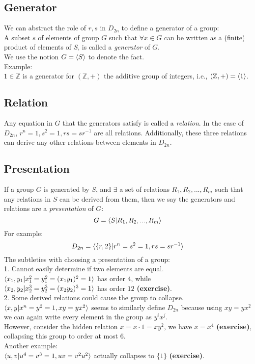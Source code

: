 \documentclass{article}
\begin{document}
\subsection{Generator}
We can abstract the role of $r, s$ in $D_{2n}$ to define a generator of a group:\\
A subset $s$ of elements of group $G$ such that $\forall x \in G$ can be written as a (finite) product of elements of $S$, is called a \textit{generator} of $G$.\\
We use the notion $G = \braket{S}$ to denote the fact.\\
Example:\\
$1 \in \mathbb{Z}$ is a generator for $(\mathbb{Z},+)$ the additive group of integers, i.e., $(\mathbb{Z}, +)=\braket{1}$.
\subsection{Relation}
Any equation in $G$ that the generators satisfy is called a \textit{relation}. In the case of $D_{2n}$, $r^n=1, s^2=1, rs=sr^{-1}$ are all relations. Additionally, these three relations can derive any other relations between elements in $D_{2n}$.
\subsection{Presentation}
If a group $G$ is generated by $S$, and $\exists$ a set of relations ${R_1, R_2, ..., R_m}$ such that any relations in $S$ can be derived from them, then we say the generators and relations are a \textit{presentation} of $G$:
\begin{equation*}
    G=\braket{S|R_1, R_2, ..., R_m}
\end{equation*}
For example:
\begin{equation*}
    D_{2n}=\braket{\{r,2\}|r^n=s^2=1, rs=sr^{-1}}
\end{equation*}
The subtleties with choosing a presentation of a group:\\
1. Cannot easily determine if two elements are equal.\\
$\braket{x_1, y_1 | x_1^2=y_1^2=(x_1y_1)^2=1}$ has order $4$, while\\
$\braket{x_2, y_2 | x_2^3=y_2^3=(x_2y_2)^3=1}$ has order $12$ \textbf{(exercise)}.\\
2. Some derived relations could cause the group to collapse.\\
$\braket{x,y|x^n=y^2=1, xy=yx^2}$ seems to similarly define $D_{2n}$ because using $xy=yx^2$ we can again write every element in the group as $y^ix^j$.\\
However, consider the hidden relation $x=x\cdot 1=xy^2$, we have $x=x^4$ \textbf{(exercise)}, collapsing this group to order at most $6$.\\
Another example:\\
$\braket{u,v|u^4=v^3=1, uv=v^2u^2}$ actually collapses to $\{1\}$ \textbf{(exercise)}.
\end{document}
